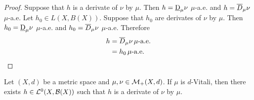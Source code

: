 \documentclass{book}
\begin{document}
	\begin{proof}
		Suppose that $h$ is a derivate of $\nu$ by $\mu$. Then $h = \underbar{D}_{\mu}\nu$ $\mu$-a.e. and $h = \overline{D}_{\mu}\nu$ $\mu$-a.e. Let $h_0 \in L(X, B(X))$. Suppose that $h_0$ are derivates of $\nu$ by $\mu$. Then $h_0 = \underbar{D}_{\mu}\nu$ $\mu$-a.e. and $h_0 = \overline{D}_{\mu}\nu$ $\mu$-a.e. Therefore
		\begin{align*}
			h
			& = \overline{D}_{\mu}\nu \, \mu \text{-a.e.} \\
			& = h_0 \, \mu \text{-a.e.}
		\end{align*}
	\end{proof}
	
	\begin{ex} 
		Let $(X, d)$ be a metric space and $\mu, \nu \in \mathcal{M}_+(X, d)$. If $\mu$ is $d$-Vitali, then there exists $h \in \mathcal{L}^0(X, \mathcal{B}(X))$ such that $h$ is a derivate of $\nu$ by $\mu$.
	\end{ex}
\end{document}
